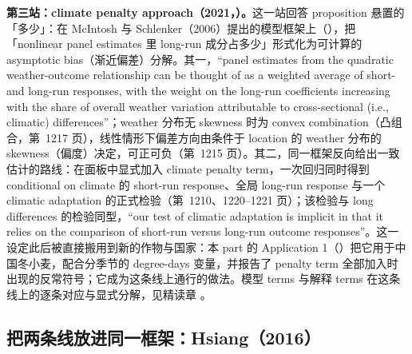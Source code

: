 \textbf{第三站：climate penalty approach（2021，）。}这一站回答 proposition 悬置的「多少」：在 McIntosh 与 Schlenker（2006）提出的模型框架上（\citealp{mcintosh2006identifying}），把「nonlinear panel estimates 里 long-run 成分占多少」形式化为可计算的 asymptotic bias（渐近偏差）分解。其一，``panel estimates from the quadratic weather-outcome relationship can be thought of as a weighted average of short- and long-run responses, with the weight on the long-run coefficients increasing with the share of overall weather variation attributable to cross-sectional (i.e., climatic) differences''\citep[第~1209 页]{merel2021climate}；weather 分布无 skewness 时为 convex combination（凸组合，第~1217 页），线性情形下偏差方向由条件于 location 的 weather 分布的 skewness（偏度）决定，可正可负（第~1215 页）。其二，同一框架反向给出一致估计的路线：在面板中显式加入 climate penalty term，一次回归同时得到 conditional on climate 的 short-run response、全局 long-run response 与一个 climatic adaptation 的正式检验（第~1210、1220--1221 页）；该检验与 long differences 的检验同型，``our test of climatic adaptation is implicit in that it relies on the comparison of short-run versus long-run outcome responses''\citep[第~1210 页]{merel2021climate}。这一设定此后被直接搬用到新的作物与国家：本 part 的 Application 1（）把它用于中国冬小麦，配合分季节的 degree-days 变量，并报告了 penalty term 全部加入时出现的反常符号；它成为这条线上通行的做法。模型 terms 与解释 terms 在这条线上的逐条对应与显式分解，见精读章 。

\subsection{把两条线放进同一框架：Hsiang（2016）}

